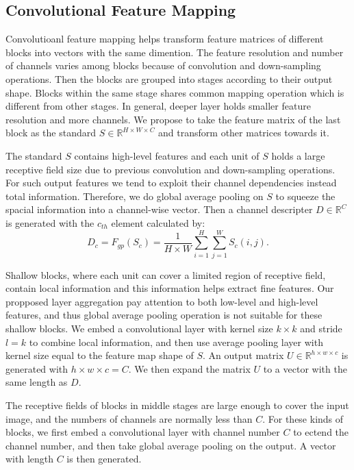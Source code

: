 \documentclass[runningheads]{llncs}
\begin{document}
\subsection{Convolutional Feature Mapping}

Convolutioanl feature mapping helps transform feature matrices of different blocks into vectors with the same dimention. The feature resolution and number of channels varies among blocks because of convolution and down-sampling operations. Then the blocks are grouped into stages according to their output shape. Blocks within the same stage shares common mapping operation which is different from other stages. In general, deeper layer holds smaller feature resolution and more channels. We propose to take the feature matrix of the last block as the standard $S \in \mathbb{R}^{H\times W \times C}$ and transform other matrices towards it. 

The standard $S$ contains high-level features and each unit of $S$ holds a large receptive field size due to previous convolution and down-sampling operations. For such output features we tend to exploit their channel dependencies instead total information. Therefore, we do global average pooling on $S$ to squeeze the spacial information into a channel-wise vector. Then a channel descripter $D\in \mathbb{R}^C$ is generated with the $c_{th}$ element calculated by:
\begin{equation}
D_c = F_{gp}(S_c) = \frac{1}{H\times W}\sum_{i=1}^H\sum_{j=1}^W S_c(i,j).
\end{equation}

Shallow blocks, where each unit can cover a limited region of receptive field, contain local information and this information helps extract fine features. Our propposed layer aggregation pay attention to both low-level and high-level features,  and thus global average pooling operation is not suitable for these shallow blocks. We embed a convolutional layer with kernel size $k\times k$ and stride $l=k$ to combine local information, and then use average pooling layer with kernel size equal to the feature map shape of $S$.  An output matrix $U\in \mathbb{R}^{h\times w\times c}$ is generated with $h\times w\times c=C$.  We then expand the matrix $U$ to a vector with the same length as $D$.

The receptive fields of  blocks in middle stages are large enough to cover the input image, and the numbers of channels are normally less than $C$. For these kinds of blocks, we first embed a convolutional layer with channel number $C$ to ectend the channel number, and then take global average pooling on the output. A vector with length $C$ is then generated.
\end{document}
